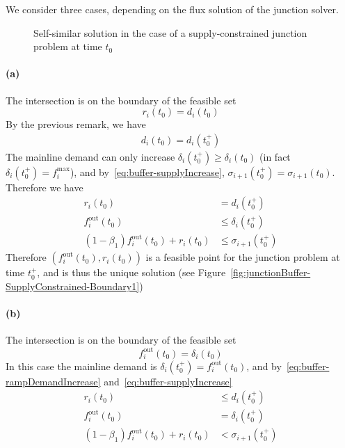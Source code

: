 We consider three cases, depending on the flux solution of the junction solver.

\begin{figure}[h]
\centering
\subfloat[Solution on the boundary $r_i = d_i$]{
\resizebox{.33\columnwidth}{!}{
	
}
\label{fig:junctionBuffer-SupplyConstrained-Boundary1}
}
\subfloat[Solution on the boundary $f_i^{\text{out}} = \delta_i$]{
\resizebox{.33\columnwidth}{!}{
	
}
\label{fig:junctionBuffer-SupplyConstrained-Boundary2}
}
\caption{Self-similar solution in the case of a supply-constrained junction problem at time $t_0$}
\label{fig:junctionBuffer-SupplyConstrained}
\end{figure}


\paragraph{(a)} The intersection is on the boundary of the feasible set
\[
r_i(t_0) = d_i(t_0)
\]
By the previous remark, we have
\begin{align*}
d_i(t_0) = d_i(t_0^+)
\end{align*}
The mainline demand can only increase $\delta_i(t_0^+) \geq \delta_i(t_0)$ (in fact $\delta_i(t_0^+) = f_i^{\max}$), and by~\eqref{eq:buffer-supplyIncrease}, $\sigma_{i+1}(t_0^+) = \sigma_{i+1}(t_0)$. Therefore we have
\begin{align*}
r_i(t_0) &= d_i(t_0^+) \\
f_i^{\text{out}}(t_0) &\leq \delta_i(t_0^+) \\
(1-\beta_1)f_i^{\text{out}}(t_0) + r_i(t_0) & \le \sigma_{i+1}(t_0^+)
\end{align*}
Therefore $(f_i^{\text{out}}(t_0), r_i(t_0))$ is a feasible point for the junction problem at time $t_0^+$, and is thus the unique solution (see Figure~\ref{fig:junctionBuffer-SupplyConstrained-Boundary1})


\paragraph{(b)} The intersection is on the boundary of the feasible set
\[
f_i^{\text{out}}(t_0) = \delta_i(t_0)
\]
In this case the mainline demand is $\delta_i(t_0^+) = f_i^{\text{out}}(t_0)$, and by~\eqref{eq:buffer-rampDemandIncrease} and~\eqref{eq:buffer-supplyIncrease}
\begin{align*}
r_i(t_0) &\leq d_i(t_0^+) \\
f_i^{\text{out}}(t_0) &= \delta_i(t_0^+) \\
(1-\beta_1)f_i^{\text{out}}(t_0) + r_i(t_0) & < \sigma_{i+1}(t_0^+)
\end{align*}

